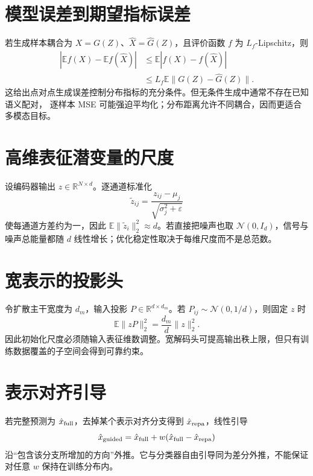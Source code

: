 \documentclass[11pt]{article}
\numberwithin{equation}{section}
\newcommand{\R}{\mathbb{R}}
\newcommand{\E}{\mathbb{E}}
\newcommand{\1}{\mathbf{1}}
\newcommand{\cN}{\mathcal{N}}
\begin{document}
\section{模型误差到期望指标误差}

若生成样本耦合为 $X=G(Z)$、$\widehat X=\widehat G(Z)$，且评价函数
$f$ 为 $L_f$-Lipschitz，则
\begin{align}
 |\E f(X)-\E f(\widehat X)|
 &\le\E|f(X)-f(\widehat X)|\\
 &\le L_f\E\|G(Z)-\widehat G(Z)\|.
\end{align}
这给出点对点生成误差控制分布指标的充分条件。但无条件生成中通常不存在已知语义配对，
逐样本 MSE 可能强迫平均化；分布距离允许不同耦合，因而更适合多模态目标。

\section{高维表征潜变量的尺度}
设编码器输出 $z\in\R^{N\times d}$。逐通道标准化
\begin{equation}
  \tilde z_{ij}=\frac{z_{ij}-\mu_j}{\sqrt{\sigma_j^2+\varepsilon}}
\end{equation}
使每通道方差约为一，因此 $\E\|\tilde z_i\|_2^2\approx d$。若直接把噪声也取 $\cN(0,I_d)$，信号与噪声总能量都随 $d$ 线性增长；优化稳定性取决于每维尺度而不是总范数。

\section{宽表示的投影头}
令扩散主干宽度为 $d_m$，输入投影 $P\in\R^{d\times d_m}$。若 $P_{ij}\sim\cN(0,1/d)$，则固定 $z$ 时
\begin{equation}
  \E\|zP\|_2^2=\frac{d_m}{d}\|z\|_2^2.
\end{equation}
因此初始化尺度必须随输入表征维数调整。宽解码头可提高输出秩上限，但只有训练数据覆盖的子空间会得到可靠约束。

\section{表示对齐引导}
若完整预测为 $\hat x_{\rm full}$，去掉某个表示对齐分支得到 $\hat x_{\rm repa}$，线性引导
\begin{equation}
  \hat x_{\rm guided}=\hat x_{\rm full}
  +w(\hat x_{\rm full}-\hat x_{\rm repa})
\end{equation}
沿“包含该分支所增加的方向”外推。它与分类器自由引导同为差分外推，不能保证对任意 $w$ 保持在训练分布内。
\end{document}
